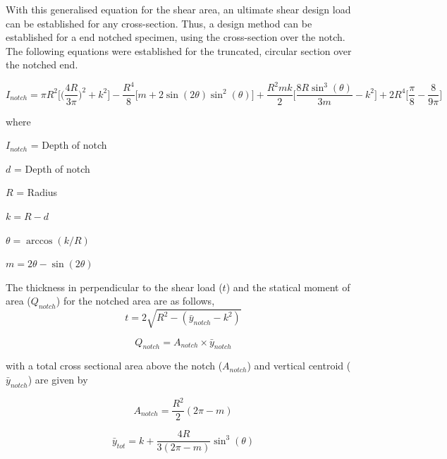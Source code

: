 \documentclass[11pt,a4paper]{article}
\numberwithin{equation}{subsection}
\begin{document}
\vspace*{\baselineskip}

\noindent
With this generalised equation for the shear area, an ultimate shear design load can be established for any cross-section. Thus, a design method can be established for a end notched specimen, using the cross-section over the notch. The following equations were established for the truncated, circular section over the notched end.

	\begin{equation}
	I_{notch} = \pi R^{2}\bigg[\bigg(\frac{4R}{3\pi}\bigg)^{2}+k^{2}\bigg]- \frac{R^{4}}{8}\bigg[m+2\sin(2\theta)\sin^{2}(\theta)\bigg]+\frac{R^{2}mk}{2}\bigg[\frac{8R\sin^{3}(\theta)}{3m}-k^{2}\bigg]+2R^{4}\bigg[\frac{\pi}{8}-\frac{8}{9\pi}\bigg]
	\label{eq:Itot}
	\end{equation} 
	
	where\par
	$ I_{notch} $ = Depth of notch \par
	$ d $ = Depth of notch \par
	$ R $ = Radius \par
	$ k  = R - d$ \par
	$ \theta = \arccos(k/R)$ \par
	$ m = 2\theta-\sin(2\theta)$ \par

	\vspace*{\baselineskip}
	\noindent
	The thickness in perpendicular to the shear load ($t$) and the statical moment of area ($Q_{notch}$) for the notched area are as follows, 
	\begin{equation}
	t = 2\sqrt{R^{2}-( \bar y_{notch}-k^{2})}
	\end{equation}
	
	\begin{equation}
	Q_{notch} = A_{notch} \times \bar y_{notch}
	\end{equation}
	
	\noindent
	with a total cross sectional area above the notch ($A_{notch}$) and vertical centroid ($\bar{y}_{notch}$) are given by
	
	\begin{equation}
	A_{notch} = \frac{R^{2}}{2}(2\pi-m)
	\end{equation}
	
	\begin{equation}
	\bar y_{tot} = k + \frac{4R}{3(2\pi-m)}\sin^{3}(\theta)
	\end{equation}
\end{document}
